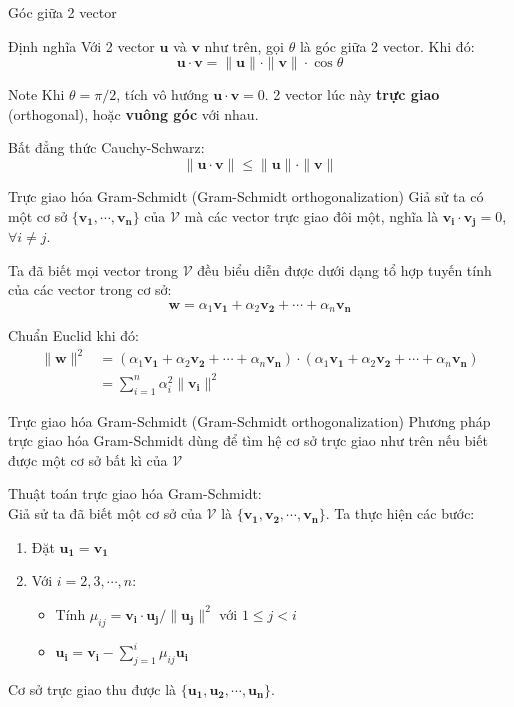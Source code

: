 \begin{frame}{Góc giữa 2 vector}
    \begin{block}{Định nghĩa}
         Với 2 vector $\bm{u}$ và $\bm{v}$ như trên, gọi $\theta$ là góc giữa 2 vector. Khi đó: \[\bm{u} \cdot \bm{v} = \|\bm{u}\| \cdot \|\bm{v}\| \cdot \cos \theta \]   
    \end{block}
    
    \begin{alertblock}{Note}
        Khi $\theta = \pi / 2$, tích vô hướng $\bm{u} \cdot \bm{v} = 0$. 2 vector lúc này \textbf{trực giao} (orthogonal), hoặc \textbf{vuông góc} với nhau.
    
        Bất đẳng thức Cauchy-Schwarz: \[\|\bm{u} \cdot \bm{v}\| \leq \|\bm{u}\| \cdot \|\bm{v}\|\]
    \end{alertblock}
    
\end{frame}

\begin{frame}{Trực giao hóa Gram-Schmidt (Gram-Schmidt orthogonalization)}
    Giả sử ta có một cơ sở $\{\bm{v_1}, \cdots, \bm{v_n}\}$ của $\mathcal{V}$ mà các vector trực giao đôi một, nghĩa là $\bm{v_i} \cdot \bm{v_j} = 0$, $\forall i \neq j$.
    
    Ta đã biết mọi vector trong $\mathcal{V}$ đều biểu diễn được dưới dạng tổ hợp tuyến tính của các vector trong cơ sở: \[\bm{w} = \alpha_1 \bm{v_1} + \alpha_2 \bm{v_2} + \cdots + \alpha_n \bm{v_n}\]
    
    Chuẩn Euclid khi đó: \begin{align*}
        \| \bm{w} \| ^2 & = (\alpha_1 \bm{v_1} + \alpha_2 \bm{v_2} + \cdots + \alpha_n \bm{v_n}) \cdot (\alpha_1 \bm{v_1} + \alpha_2 \bm{v_2} + \cdots + \alpha_n \bm{v_n}) \\ & = \sum_{i=1}^{n}\alpha_i^2 \| \bm{v_i} \|^2 
    \end{align*}
\end{frame}

\begin{frame}{Trực giao hóa Gram-Schmidt (Gram-Schmidt orthogonalization)}
    Phương pháp trực giao hóa Gram-Schmidt dùng để tìm hệ cơ sở trực giao như trên nếu biết được một cơ sở bất kì của $\mathcal{V}$
    
    Thuật toán trực giao hóa Gram-Schmidt: \\ Giả sử ta đã biết một cơ sở của $\mathcal{V}$ là $\{\bm{v_1}, \bm{v_2}, \cdots, \bm{v_n}\}$. Ta thực hiện các bước:
    \begin{enumerate}
        \item Đặt $\bm{u_1} = \bm{v_1}$
        \item Với $i=2, 3, \cdots, n$:
        \begin{itemize}
            \item Tính $\mu_{ij} = \bm{v_i} \cdot \bm{u_j} / \| \bm{u_j} \|^2$ với $1 \leq j < i$
            \item $\bm{u_i} = \bm{v_i} - \sum_{j=1}^{i}\mu_{ij} \bm{u_i}$
        \end{itemize}
    \end{enumerate}
    
    Cơ sở trực giao thu được là $\{\mathbf{u_1}, \mathbf{u_2}, \cdots, \mathbf{u_n}\}$.
\end{frame}
